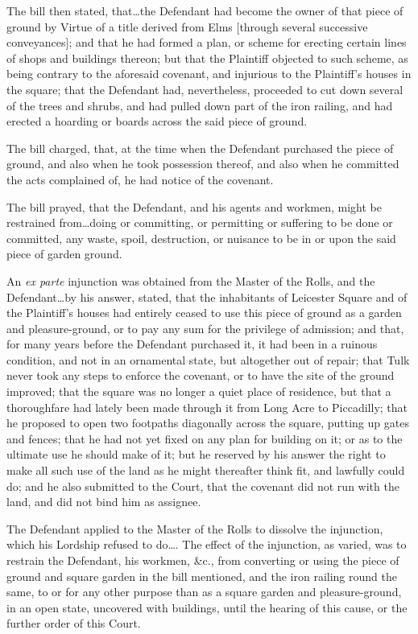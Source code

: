The bill then stated, that\ldots the Defendant had become the owner of that
piece of ground by Virtue of a title derived from Elms [through several
successive conveyances]; and that he had formed a plan, or scheme for erecting
certain lines of shops and buildings thereon; but that the Plaintiff objected to
such scheme, as being contrary to the aforesaid covenant, and injurious to the
Plaintiff's houses in the square; that the Defendant had, nevertheless,
proceeded to cut down several of the trees and shrubs, and had pulled down part
of the iron railing, and had erected a hoarding or boards across the said piece
of ground.

The bill charged, that, at the time when the Defendant purchased the piece of
ground, and also when he took possession thereof, and also when he committed the
acts complained of, he had notice of the covenant.

The bill prayed, that the Defendant, and his agents and workmen, might be
restrained from\ldots doing or committing, or permitting or suffering to be done
or committed, any waste, spoil, destruction, or nuisance to be in or upon the
said piece of garden ground.

An \textit{ex parte} injunction was obtained from the Master of the Rolls, and
the Defendant\ldots by his answer, stated, that the inhabitants of Leicester
Square and of the Plaintiff's houses had entirely ceased to use this piece of
ground as a garden and pleasure-ground, or to pay any sum for the privilege of
admission; and that, for many years before the Defendant purchased it, it had
been in a ruinous condition, and not in an ornamental state, but altogether out
of repair; that Tulk never took any steps to enforce the covenant, or to have
the site of the ground improved; that the square was no longer a quiet place of
residence, but that a thoroughfare had lately been made through it from Long
Acre to Piccadilly; that he proposed to open two footpaths diagonally across the
square, putting up gates and fences; that he had not yet fixed on any plan for
building on it; or as to the ultimate use he should make of it; but he reserved
by his answer the right to make all such use of the land as he might thereafter
think fit, and lawfully could do; and he also submitted to the Court, that the
covenant did not run with the land, and did not bind him as assignee.

The Defendant applied to the Master of the Rolls to dissolve the injunction,
which his Lordship refused to do\ldots . The effect of the injunction, as
varied, was to restrain the Defendant, his workmen, \&c., from converting or
using the piece of ground and square garden in the bill mentioned, and the iron
railing round the same, to or for any other purpose than as a square garden and
pleasure-ground, in an open state, uncovered with buildings, until the hearing
of this cause, or the further order of this Court.

